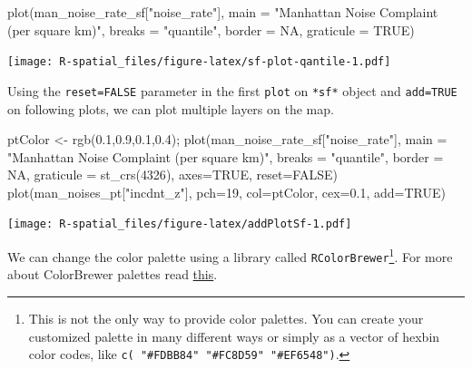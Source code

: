 \documentclass[
  11pt,
]{book}
\newenvironment{Shaded}{\begin{snugshade}}{\end{snugshade}}
\newcommand{\AttributeTok}[1]{\textcolor[rgb]{0.77,0.63,0.00}{#1}}
\newcommand{\ConstantTok}[1]{\textcolor[rgb]{0.00,0.00,0.00}{#1}}
\newcommand{\DecValTok}[1]{\textcolor[rgb]{0.00,0.00,0.81}{#1}}
\newcommand{\FloatTok}[1]{\textcolor[rgb]{0.00,0.00,0.81}{#1}}
\newcommand{\FunctionTok}[1]{\textcolor[rgb]{0.00,0.00,0.00}{#1}}
\newcommand{\NormalTok}[1]{#1}
\newcommand{\OtherTok}[1]{\textcolor[rgb]{0.56,0.35,0.01}{#1}}
\newcommand{\StringTok}[1]{\textcolor[rgb]{0.31,0.60,0.02}{#1}}
\begin{document}
\begin{Shaded}
\begin{Highlighting}[]
\FunctionTok{plot}\NormalTok{(man\_noise\_rate\_sf[}\StringTok{"noise\_rate"}\NormalTok{], }
     \AttributeTok{main =} \StringTok{"Manhattan Noise Complaint (per square km)"}\NormalTok{, }
     \AttributeTok{breaks =} \StringTok{"quantile"}\NormalTok{,}
     \AttributeTok{border =} \ConstantTok{NA}\NormalTok{,}
     \AttributeTok{graticule =} \ConstantTok{TRUE}\NormalTok{)}
\end{Highlighting}
\end{Shaded}

\texttt{[image: R-spatial\_files/figure-latex/sf-plot-qantile-1.pdf]}

Using the \texttt{reset=FALSE} parameter in the first \texttt{plot} on \texttt{*sf*} object and \texttt{add=TRUE} on following plots, we can plot multiple layers on the map.

\begin{Shaded}
\begin{Highlighting}[]
\NormalTok{ptColor }\OtherTok{\textless{}{-}} \FunctionTok{rgb}\NormalTok{(}\FloatTok{0.1}\NormalTok{,}\FloatTok{0.9}\NormalTok{,}\FloatTok{0.1}\NormalTok{,}\FloatTok{0.4}\NormalTok{);}
\FunctionTok{plot}\NormalTok{(man\_noise\_rate\_sf[}\StringTok{"noise\_rate"}\NormalTok{], }
     \AttributeTok{main =} \StringTok{"Manhattan Noise Complaint (per square km)"}\NormalTok{, }
     \AttributeTok{breaks =} \StringTok{"quantile"}\NormalTok{,}
     \AttributeTok{border =} \ConstantTok{NA}\NormalTok{,}
     \AttributeTok{graticule =} \FunctionTok{st\_crs}\NormalTok{(}\DecValTok{4326}\NormalTok{),}
     \AttributeTok{axes=}\ConstantTok{TRUE}\NormalTok{,}
     \AttributeTok{reset=}\ConstantTok{FALSE}\NormalTok{)}
\FunctionTok{plot}\NormalTok{(man\_noises\_pt[}\StringTok{"incdnt\_z"}\NormalTok{], }\AttributeTok{pch=}\DecValTok{19}\NormalTok{, }\AttributeTok{col=}\NormalTok{ptColor, }\AttributeTok{cex=}\FloatTok{0.1}\NormalTok{, }\AttributeTok{add=}\ConstantTok{TRUE}\NormalTok{)}
\end{Highlighting}
\end{Shaded}

\texttt{[image: R-spatial\_files/figure-latex/addPlotSf-1.pdf]}

We can change the color palette using a library called \texttt{RColorBrewer}\footnote{This is not the only way to provide color palettes. You can create your customized palette in many different ways or simply as a vector of hexbin color codes, like \texttt{c(\ "\#FDBB84"\ "\#FC8D59"\ "\#EF6548")}.}. For more about ColorBrewer palettes read \href{http://colorbrewer2.org}{this}.
\end{document}
